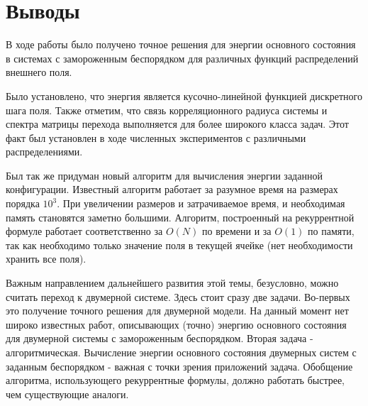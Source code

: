 \section{Выводы}
В ходе работы было получено точное решения для энергии основного состояния в системах с замороженным беспорядком для различных функций распределений внешнего поля.

Было установлено, что энергия является кусочно-линейной функцией дискретного шага поля. Также отметим, что связь корреляционного радиуса системы и спектра матрицы перехода выполняется для более широкого класса задач. Этот факт был установлен в ходе численных экспериментов с различными распределениями.

Был так же придуман новый алгоритм для вычисления энергии заданной конфигурации. Известный алгоритм работает за разумное время на размерах порядка $10^3$. При увеличении размеров и затрачиваемое время, и необходимая память становятся заметно большими. Алгоритм, построенный на рекуррентной формуле работает соответственно за $O(N)$ по времени и за $O(1)$ по памяти, так как необходимо только значение поля в текущей ячейке (нет необходимости хранить все поля).  

Важным направлением дальнейшего развития этой темы, безусловно, можно считать переход к двумерной системе. Здесь стоит сразу две задачи. Во-первых это получение точного решения для двумерной модели. На данный момент нет широко известных работ, описывающих (точно) энергию основного состояния для двумерной системы с замороженным беспорядком. 
Вторая задача - алгоритмическая. Вычисление энергии основного состояния двумерных систем с заданным беспорядком - важная с точки зрения приложений задача. Обобщение алгоритма, использующего рекуррентные формулы, должно работать быстрее, чем существующие аналоги.
